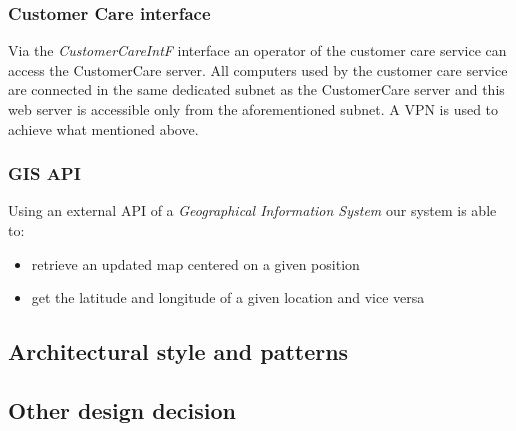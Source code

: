 \subsubsection{Customer Care interface}
Via the \emph{CustomerCareIntF} interface an operator of the customer care service can access the CustomerCare server. All computers used by the customer care service are connected in the same dedicated subnet as the CustomerCare server and this web server is accessible only from the aforementioned subnet. A VPN is used to achieve what mentioned above.

\subsubsection{GIS API}
Using an external API of a \emph{Geographical Information System} our system is able to:
\begin{itemize}
	\item retrieve an updated map centered on a given position
	\item get the latitude and longitude of a given location and vice versa
\end{itemize}

\subsection{Architectural style and patterns}
\subsection{Other design decision}
